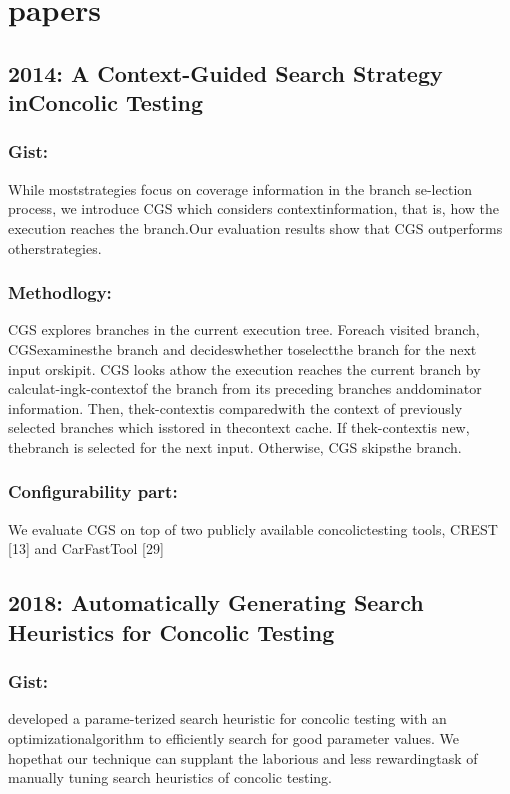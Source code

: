 \documentclass[	runningheads,
				a4paper]{llncs}
\begin{document}
\section{papers}

\subsection{2014: A Context-Guided Search Strategy inConcolic Testing}
\subsubsection{Gist:}
While moststrategies  focus  on  coverage  information  in  the  branch  se-lection process, we introduce CGS which considers contextinformation, that is, how the execution reaches the branch.Our  evaluation  results  show  that  CGS  outperforms  otherstrategies. 

\subsubsection{Methodlogy:}
CGS explores branches in the current execution tree.  Foreach visited branch, CGSexaminesthe branch and decideswhether toselectthe branch for the next input orskipit. CGS looks athow the execution reaches the current branch by calculat-ingk-contextof the branch from its preceding branches anddominator information. Then, thek-contextis comparedwith  the  context  of  previously  selected  branches  which  isstored  in  thecontext  cache.   If  thek-contextis  new,  thebranch is selected for the next input.  Otherwise, CGS skipsthe branch.

\subsubsection{Configurability part:}
We evaluate CGS on top of two publicly available concolictesting tools, CREST [13] and CarFastTool [29]


\subsection{2018: Automatically Generating Search Heuristics for Concolic Testing}
\subsubsection{Gist:}
developed a parame-terized search heuristic for concolic testing with an optimizationalgorithm to efficiently search for good parameter values. We hopethat our technique can supplant the laborious and less rewardingtask of manually tuning search heuristics of concolic testing.
\end{document}
